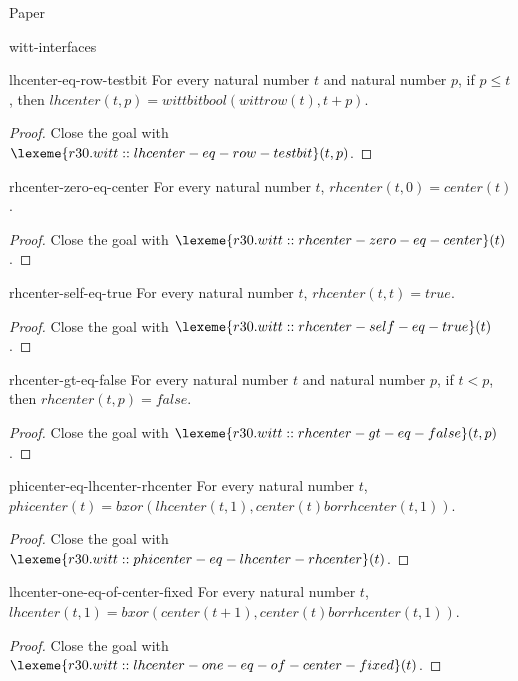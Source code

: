 \begin{lexlean}{Paper}
\begin{section}{witt-interfaces}
  \begin{theorem}{lhcenter-eq-row-testbit}
  For every natural number \(t\) and natural number \(p\), if \(p ≤ t\), then \(lhcenter(t, p) = wittbitbool(wittrow(t), t + p)\).
  \begin{proof}
  Close the goal with \(\lexeme{r30.witt::lhcenter-eq-row-testbit}(t, p)\).
  \end{proof}
  \end{theorem}

  \begin{theorem}{rhcenter-zero-eq-center}
  For every natural number \(t\), \(rhcenter(t, 0) = center(t)\).
  \begin{proof}
  Close the goal with \(\lexeme{r30.witt::rhcenter-zero-eq-center}(t)\).
  \end{proof}
  \end{theorem}

  \begin{theorem}{rhcenter-self-eq-true}
  For every natural number \(t\), \(rhcenter(t, t) = true\).
  \begin{proof}
  Close the goal with \(\lexeme{r30.witt::rhcenter-self-eq-true}(t)\).
  \end{proof}
  \end{theorem}

  \begin{theorem}{rhcenter-gt-eq-false}
  For every natural number \(t\) and natural number \(p\), if \(t < p\), then \(rhcenter(t, p) = false\).
  \begin{proof}
  Close the goal with \(\lexeme{r30.witt::rhcenter-gt-eq-false}(t, p)\).
  \end{proof}
  \end{theorem}

  \begin{theorem}{phicenter-eq-lhcenter-rhcenter}
  For every natural number \(t\), \(phicenter(t) = bxor(lhcenter(t, 1), center(t) bor rhcenter(t, 1))\).
  \begin{proof}
  Close the goal with \(\lexeme{r30.witt::phicenter-eq-lhcenter-rhcenter}(t)\).
  \end{proof}
  \end{theorem}

  \begin{theorem}{lhcenter-one-eq-of-center-fixed}
  For every natural number \(t\), \(lhcenter(t, 1) = bxor(center(t + 1), center(t) bor rhcenter(t, 1))\).
  \begin{proof}
  Close the goal with \(\lexeme{r30.witt::lhcenter-one-eq-of-center-fixed}(t)\).
  \end{proof}
  \end{theorem}


\end{section}
\end{lexlean}
